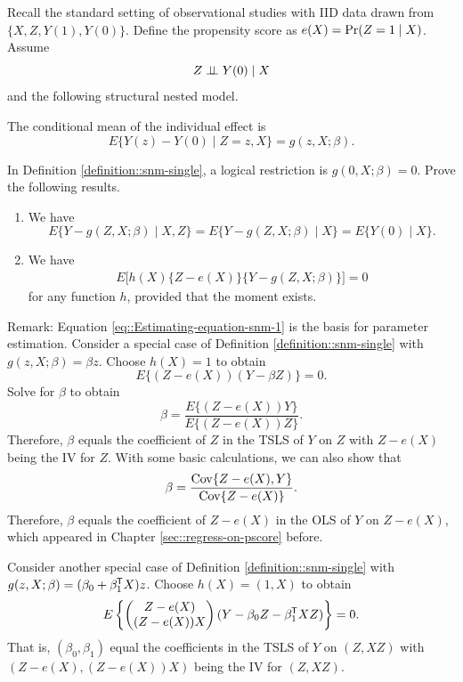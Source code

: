 \begin{HomeworkProblem}\label{exr:29-5}



Recall the standard setting of observational studies with IID data drawn from $\{ X,Z, Y(1), Y(0)\}$. Define the propensity score as $e(X) = \operatorname{Pr}(Z=1\mid X)$. Assume
\[
Z\mathrel{\perp\!\!\!\perp} Y(0)\mid X
\]
and the following structural nested model.


\begin{definition}
\label{definition::snm-single}
The conditional mean of the individual effect is
\[
E\{  Y(z) - Y(0)\mid Z=z, X \} = g(z,X;\beta).
\]
\end{definition}

In Definition \ref{definition::snm-single}, a logical restriction is $g(0,X;\beta) = 0$. Prove the following results.


\begin{enumerate}
\item
We have
\[
E\{  Y - g(Z,X;\beta) \mid X, Z\} = E\{  Y - g(Z,X;\beta) \mid X\}  = E\{  Y(0) \mid X\}.
\]


\item
We have
\begin{eqnarray}\label{eq::Estimating-equation-snm-1}
E\Big [  h(X)  \{ Z-e(X) \}   \{  Y - g(Z,X;\beta) \}  \Big ] = 0
\end{eqnarray}
for any function $h$, provided that the moment exists.
\end{enumerate}




Remark:  Equation \eqref{eq::Estimating-equation-snm-1} is the basis for parameter estimation.
Consider a special case of Definition \ref{definition::snm-single} with $g(z,X;\beta) = \beta z$. Choose $h(X) = 1$ to obtain
\[
E\{   (Z-e(X))   (Y-  \beta Z) \}  = 0.
\]
Solve for $\beta$ to obtain
\[
\beta = \frac{   E\{ (Z-e(X)) Y \}   }{   E\{ (Z-e(X))  Z\}   }.
\]
Therefore, $\beta$ equals the coefficient of $Z$ in the TSLS of $Y$ on $Z$ with $Z-e(X)$ being the IV for $Z$. With some basic calculations, we can also show that
\[
\beta = \frac{   \operatorname{Cov}\{ Z-e(X), Y\}   }{ \operatorname{Cov}\{ Z-e(X) \}  }.
\]
Therefore, $\beta$ equals the coefficient of $Z-e(X)$ in the OLS of $Y$ on $Z-e(X)$, which appeared in Chapter \ref{sec::regress-on-pscore} before.

Consider another special case of Definition \ref{definition::snm-single} with $g(z,X;\beta) = (\beta_0 + \beta_1^{\mkern-1.5mu\mathsf{T}} X) z$. Choose $h(X) = (1,X)$ to obtain
\[
E\left\{   \begin{pmatrix}
Z-e(X)\\
(Z-e(X)) X
\end{pmatrix}
(Y-  \beta_0 Z - \beta_1^{\mkern-1.5mu\mathsf{T}} XZ) \right\}  = 0.
\]
That is, $(\beta_0,\beta_1)$ equal the coefficients in the TSLS of $Y$ on $(Z, XZ)$ with $(Z-e(X),  (Z-e(X)) X )$ being the IV for $(Z, XZ)$.



\end{HomeworkProblem}

